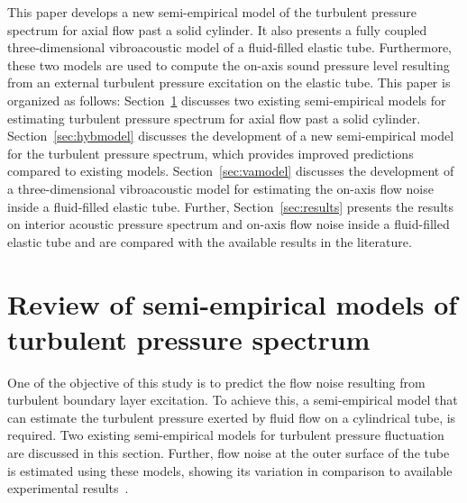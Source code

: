 \documentclass[11pt,cleanfoot]{asme2ej}
\begin{document}
This paper develops a new semi-empirical model of the turbulent pressure spectrum for axial flow past a solid cylinder. It also presents a fully coupled three-dimensional vibroacoustic model of a fluid-filled elastic tube. Furthermore, these two models are used to compute the on-axis sound pressure level resulting from an external turbulent pressure excitation on the elastic tube. This paper is organized as follows: Section~\ref{sec:empmodels} discusses two existing semi-empirical models for estimating turbulent pressure spectrum for axial flow past a solid cylinder. Section~\ref{sec:hybmodel} discusses the development of a new semi-empirical model for the turbulent pressure spectrum, which provides improved predictions compared to existing models. Section~\ref{sec:vamodel} discusses the development of a three-dimensional vibroacoustic model for estimating the on-axis flow noise inside a fluid-filled elastic tube. Further, Section~\ref{sec:results} presents the results on interior acoustic pressure spectrum and on-axis flow noise inside a fluid-filled elastic tube and are compared with the available results in the literature.


\section{Review of semi-empirical models of turbulent pressure spectrum} \label{sec:empmodels}

One of the objective of this study is to predict the flow noise resulting from turbulent boundary layer excitation. To achieve this, a semi-empirical model that can estimate the turbulent pressure exerted by fluid flow on a cylindrical tube, is required. Two existing semi-empirical models for turbulent pressure fluctuation are discussed in this section. Further, flow noise at the outer surface of the tube is estimated using these models, showing its variation in comparison to available experimental results~\cite{Unni2011}. 
\end{document}
